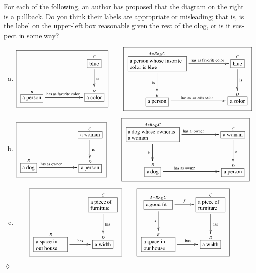 \documentclass{book}
\def\tn{\textnormal}
\def\hsp{\hspace{.3in}}
\def\rr{\raggedright}
\newcommand{\LA}[2]{\ar[#1]^-{\tn {#2}}}
\newcommand{\LAL}[2]{\ar[#1]_-{\tn {#2}}}
\newcommand{\obox}[3]{\stackrel{#1}{\fbox{\parbox{#2}{#3}}}}
\newcommand{\smbox}[2]{\stackrel{#1}{\fbox{#2}}}
\theoremstyle{theoremENG}
\theoremstyle{lemmaENG}
\theoremstyle{propositionENG}
\theoremstyle{corollaryENG}
\theoremstyle{factENG}
\theoremstyle{remarkENG}
\newtheorem{remarkENG}[subsubsection]{\begin{english}Remark\end{english}}
\theoremstyle{exampleENG}
\theoremstyle{warningENG}
\theoremstyle{questionENG}
\theoremstyle{guessENG}
\theoremstyle{answerENG}
\theoremstyle{constructionENG}
\theoremstyle{rulesENG}
\theoremstyle{excENG}
\newtheorem{excENG}[subsubsection]{\begin{english}Exercise\end{english}}
\theoremstyle{appENG}
\theoremstyle{definitionENG}
\theoremstyle{notationENG}
\theoremstyle{conjectureENG}
\theoremstyle{postulateENG}
\newenvironment{exerciseENG}{\begin{excENG}}{\hspace*{\fill}$\lozenge$\end{excENG}}
\theoremstyle{theoremRUS}
\theoremstyle{lemmaRUS}
\theoremstyle{propositionRUS}
\theoremstyle{corollaryRUS}
\theoremstyle{factRUS}
\theoremstyle{remarkRUS}
\theoremstyle{exampleRUS}
\theoremstyle{warningRUS}
\theoremstyle{questionRUS}
\theoremstyle{guessRUS}
\theoremstyle{answerRUS}
\theoremstyle{constructionRUS}
\theoremstyle{rulesRUS}
\theoremstyle{excRUS}
\theoremstyle{appRUS}
\theoremstyle{definitionRUS}
\theoremstyle{notationRUS}
\theoremstyle{conjectureRUS}
\theoremstyle{postulateRUS}
\def\sexc{\begin{enumerate}[a.)]\setlength{\itemsep}{.1cm}\setlength{\parskip}{.1cm}\item}
\def\next{\item}
\def\endsexc{\end{enumerate}}
\begin{document}
\begin{english}
\begin{remarkENG}
\begin{russian} \end{russian}

\end{remarkENG}

\begin{exerciseENG}

For each of the following, an author has proposed that the diagram on the right is a pullback. Do you think their labels are appropriate or misleading; that is, is the label on the upper-left box reasonable given the rest of the olog, or is it suspect in some way?
\sexc\begin{align*}\footnotesize\fbox{\xymatrix{&&\smbox{C}{blue}\LA{d}{is}\\\smbox{B}{a person}\LA{rr}{\parbox{.7in}{\rr has as favorite color}}&&\smbox{D}{a color}}}\hsp&
\footnotesize\fbox{\xymatrixnocompile{\obox{A=B\times_DC}{1.1in}{\rr a person whose favorite color is blue}\LAL{d}{is}\LA{rr}{\parbox{.7in}{\rr has as favorite color}}&&\smbox{C}{blue}\LA{d}{is}\\\smbox{B}{a person}\LA{rr}{\parbox{.7in}{\rr has as favorite color}}&&\smbox{D}{a color}}}
\end{align*}
\next\begin{align*}
\footnotesize\fbox{\xymatrixnocompile{&&\smbox{C}{a woman}\LA{d}{is}\\\smbox{B}{a dog}\LA{rr}{\parbox{.7in}{\rr has as owner}}&&\smbox{D}{a person}}}\hsp&
\footnotesize\fbox{\xymatrixnocompile{\obox{A=B\times_DC}{1in}{\rr a dog whose owner is a woman}\LAL{d}{is}\LA{rr}{\parbox{.7in}{\rr has as owner}}&&\smbox{C}{a woman}\LA{d}{is}\\\smbox{B}{a dog}\LA{rr}{\parbox{.7in}{\rr has as owner}}&&\smbox{D}{a person}}}
\end{align*}
\next\begin{align*}
\footnotesize\fbox{\xymatrixnocompile{&\obox{C}{.5in}{\rr a piece of furniture}\LA{d}{has}\\\obox{B}{.6in}{\rr a space in our house}\LA{r}{has}&\smbox{D}{a width}}}\hsp&
\footnotesize\fbox{\xymatrixnocompile{\obox{A=B\times_DC}{.5in}{\rr a good fit}\LAL{d}{$s$}\LA{r}{$f$}&\obox{C}{.5in}{\rr a piece of furniture}\LA{d}{has}\\\obox{B}{.6in}{\rr a space in our house}\LA{r}{has}&\smbox{D}{a width}}}
\end{align*}
\endsexc

\begin{russian} \end{russian}


\end{exerciseENG}
\end{english}
\end{document}
